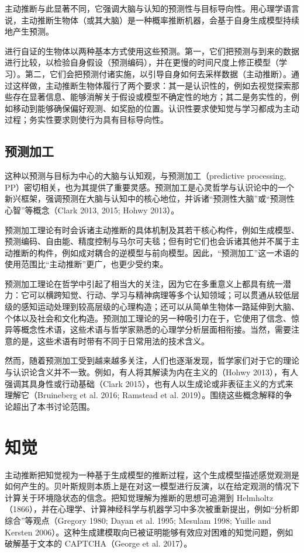 主动推断与此显著不同，它强调大脑与认知的预测性与目标导向性。用心理学语言说，主动推断生物体（或其大脑）是一种概率推断机器，会基于自身生成模型持续地产生预测。

进行自证的生物体以两种基本方式使用这些预测。第一，它们把预测与到来的数据进行比较，以检验自身假设（预测编码），并在更慢的时间尺度上修正模型（学习）。第二，它们会把预测付诸实施，以引导自身如何去采样数据（主动推断）。通过这样做，主动推断生物体履行了两个要求：其一是认识性的，例如去视觉探索那些存在显著信息、能够消解关于假设或模型不确定性的地方；其二是务实性的，例如移动到能够确保偏好观测、如奖励的位置。认识性要求使知觉与学习都成为主动过程；务实性要求则使行为具有目标导向性。

\subsection{预测加工}

这种以预测与目标为中心的大脑与认知观，与预测加工（predictive processing, PP）密切相关，也为其提供了重要灵感。预测加工是心灵哲学与认识论中的一个新兴框架，强调预测在大脑与认知中的核心地位，并诉诸“预测性大脑”或“预测性心智”等概念（Clark 2013, 2015; Hohwy 2013）。

预测加工理论有时会诉诸主动推断的具体机制及其若干核心构件，例如生成模型、预测编码、自由能、精度控制与马尔可夫毯；但有时它们也会诉诸其他并不属于主动推断的构件，例如成对耦合的逆模型与前向模型。因此，“预测加工”这一术语的使用范围比“主动推断”更广，也更少受约束。

预测加工理论在哲学中引起了相当大的关注，因为它在多重意义上都具有统一潜力：它可以横跨知觉、行动、学习与精神病理等多个认知领域；可以贯通从较低层级的感知运动处理到较高层级的心理构造；还可以从简单生物体一路延伸到大脑、个体以及社会和文化构造。预测加工理论的另一种吸引力在于，它使用了信念、惊异等概念性术语，这些术语与哲学家熟悉的心理学分析层面相衔接。当然，需要注意的是，这些术语有时带有不同于日常用法的技术含义。

然而，随着预测加工受到越来越多关注，人们也逐渐发现，哲学家们对于它的理论与认识论含义并不一致。例如，有人将其解读为内在主义的（Hohwy 2013），有人强调其具身性或行动基础（Clark 2015），也有人以生成论或非表征主义的方式来理解它（Bruineberg et al. 2016; Ramstead et al. 2019）。围绕这些概念解释的争论超出了本书讨论范围。

\section{知觉}

主动推断把知觉视为一种基于生成模型的推断过程，这个生成模型描述感觉观测是如何产生的。贝叶斯规则本质上是在对这一模型进行反演，以在给定观测的情况下计算关于环境隐状态的信念。把知觉理解为推断的思想可追溯到 Helmholtz（1866），并在心理学、计算神经科学与机器学习中多次被重新提出，例如“分析即综合”等观点（Gregory 1980; Dayan et al. 1995; Mesulam 1998; Yuille and Kersten 2006）。这种生成建模取向已被证明能够有效应对困难的知觉问题，例如破解基于文本的 CAPTCHA（George et al. 2017）。

